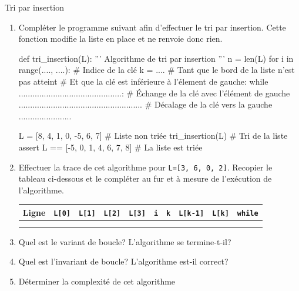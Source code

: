 \begin{exercice_cours}{Tri par insertion}{}
	\begin{enumerate}
		\item 	Compléter le programme suivant afin d'effectuer le tri par insertion. Cette fonction modifie la liste en place et ne renvoie donc rien.


	\begin{CodePythontexAlt}[TaillePolice=\normalsize, Largeur=1\linewidth,Centre,PremLigne=1, Lignes=true,]{}
		def tri_insertion(L):
			''' Algorithme de tri par insertion '''
			n = len(L)
			for i in range(...., ....):
				# Indice de la clé
				k = .... 				
				# Tant que le bord de la liste n'est pas atteint
				# Et que la clé est inférieure à l'élement de gauche:
				while .............................................:
					# Échange de la clé avec l'élément de gauche
					...................................................... 
					# Décalage de la clé vers la gauche
					....................... 
		
		L = [8, 4, 1, 0, -5, 6, 7]				 # Liste non triée
		tri_insertion(L)					   # Tri de la liste
		assert L == [-5, 0, 1, 4, 6, 7, 8] 	# La liste est triée
		\end{CodePythontexAlt}


		\item Effectuer la trace de cet algorithme pour \verb+L=[3, 6, 0, 2]+. Recopier le tableau ci-dessous et le compléter au fur et à mesure de l'exécution de l'algorithme.
		
		\begin{center}
			
		\begin{tabular}{|c|c|c|c|c|c|c|c|c|c|}
			\hline
			Ligne & \verb+L[0]+ & \verb+L[1]+ & \verb+L[2]+ & \verb+L[3]+ & \verb+i+ & \verb+k+ & \verb+L[k-1]+ & \verb+L[k]+ & \verb+while+ \\
			\hline
			&&&&&&&&&\\ \hline
&&&&&&&&&\\ \hline

		\end{tabular}
	\end{center}

	\item Quel est le variant de boucle? L'algorithme se termine-t-il? \dotfill{}
	\dotfill{}

	\dotfill{}

	\dotfill{}

	\dotfill{}

	\dotfill{}

	\item Quel est l'invariant de boucle? L'algorithme est-il correct? \dotfill{}
	
	\dotfill{}

	\dotfill{}

	\dotfill{}

	\dotfill{}

	\item Déterminer la complexité de cet algorithme \dotfill{}
	\end{enumerate}

\end{exercice_cours}

